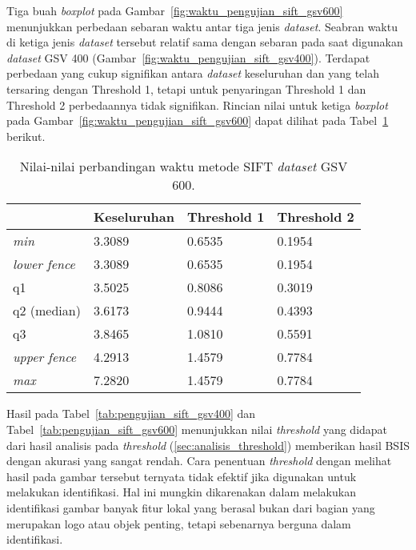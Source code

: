Tiga buah \textit{boxplot} pada Gambar~\ref{fig:waktu_pengujian_sift_gsv600} menunjukkan perbedaan sebaran waktu antar tiga jenis \textit{dataset}. Seabran waktu di ketiga jenis \textit{dataset} tersebut relatif sama dengan sebaran pada saat digunakan \textit{dataset} GSV 400 (Gambar~\ref{fig:waktu_pengujian_sift_gsv400}). Terdapat perbedaan yang cukup signifikan antara \textit{dataset} keseluruhan dan yang telah tersaring dengan Threshold 1, tetapi untuk penyaringan Threshold 1 dan Threshold 2 perbedaannya tidak signifikan. Rincian nilai untuk ketiga \textit{boxplot} pada Gambar~\ref{fig:waktu_pengujian_sift_gsv600} dapat dilihat pada Tabel~\ref{tab:boxplot_gsv600_sift} berikut.
\begin{table}[H]
	\centering
	\begin{tabular}{|l|l|l|l|}
		\hline
		& \textbf{Keseluruhan} & \textbf{Threshold 1} & \textbf{Threshold 2} \\ \hline
		\textit{min}          & 3.3089 & 0.6535 & 0.1954              \\ \hline
		\textit{lower fence}  & 3.3089 & 0.6535 & 0.1954              \\ \hline
		q1                    & 3.5025 & 0.8086 & 0.3019              \\ \hline
		q2 (median)           & 3.6173 & 0.9444 & 0.4393              \\ \hline
		q3                    & 3.8465 & 1.0810 & 0.5591              \\ \hline
		\textit{upper fence}  & 4.2913 & 1.4579 & 0.7784              \\ \hline
		\textit{max}          & 7.2820 & 1.4579 & 0.7784              \\ \hline
	\end{tabular}
	\caption{Nilai-nilai perbandingan waktu metode SIFT \textit{dataset} GSV 600.}
	\label{tab:boxplot_gsv600_sift}
\end{table}

Hasil pada Tabel~\ref{tab:pengujian_sift_gsv400} dan Tabel~\ref{tab:pengujian_sift_gsv600} menunjukkan nilai \textit{threshold} yang didapat dari hasil analisis pada \textit{threshold} (\ref{sec:analisis_threshold}) memberikan hasil BSIS dengan akurasi yang sangat rendah. Cara penentuan \textit{threshold} dengan melihat hasil pada gambar tersebut ternyata tidak efektif jika digunakan untuk melakukan identifikasi. Hal ini mungkin dikarenakan dalam melakukan identifikasi gambar banyak fitur lokal yang berasal bukan dari bagian yang merupakan logo atau objek penting, tetapi sebenarnya berguna dalam identifikasi.

